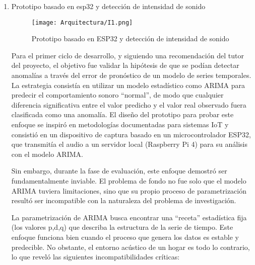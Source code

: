 \begin{enumerate}
      \item Prototipo basado en esp32 y detección de intensidad de sonido

            \begin{figure}[ht!]
                  \centering
                  \texttt{[image: Arquitectura/I1.png]}
                  \caption{Prototipo basado en ESP32 y detección de intensidad de sonido}
                  \label{fig:prototipo1}
            \end{figure}

            Para el primer ciclo de desarrollo, y siguiendo una recomendación del tutor del proyecto, el objetivo fue validar la hipótesis de que se podían detectar anomalías a través del error de pronóstico de un modelo de series temporales. La estrategia consistía en utilizar un modelo estadístico como ARIMA para predecir el comportamiento sonoro ``normal'', de modo que cualquier diferencia significativa entre el valor predicho y el valor real observado fuera clasificada como una anomalía. El diseño del prototipo para probar este enfoque se inspiró en metodologías documentadas para sistemas IoT \cite{luis2024desarrollo} y consistió en un dispositivo de captura basado en un microcontrolador ESP32, que transmitía el audio a un servidor local (Raspberry Pi 4) para su análisis con el modelo ARIMA.

            Sin embargo, durante la fase de evaluación, este enfoque demostró ser fundamentalmente inviable. El problema de fondo no fue solo que el modelo ARIMA tuviera limitaciones, sino que su propio proceso de parametrización resultó ser incompatible con la naturaleza del problema de investigación.

            La parametrización de ARIMA busca encontrar una ``receta'' estadística fija (los valores p,d,q) que describa la estructura de la serie de tiempo. Este enfoque funciona bien cuando el proceso que genera los datos es estable y predecible. No obstante, el entorno acústico de un hogar es todo lo contrario, lo que reveló las siguientes incompatibilidades críticas:


\end{enumerate}
